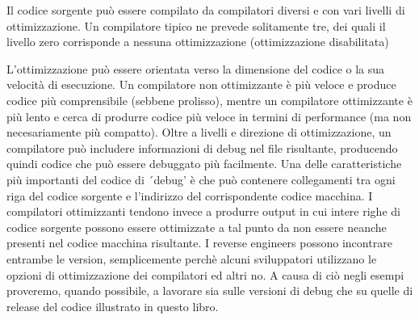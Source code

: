 Il codice sorgente può essere compilato da compilatori diversi e con vari livelli di ottimizzazione.
Un compilatore tipico ne prevede solitamente tre, dei quali il livello zero corrisponde a nessuna ottimizzazione (ottimizzazione disabilitata) 

L'ottimizzazione può essere orientata verso la dimensione del codice o la sua velocità di esecuzione.
Un compilatore non ottimizzante è più veloce e produce codice più comprensibile (sebbene prolisso), mentre un compilatore ottimizzante è più lento e cerca di produrre codice più veloce in termini di performance (ma non necesariamente più compatto).
Oltre a livelli e direzione di ottimizzazione, un compilatore può includere informazioni di debug nel file risultante, producendo quindi codice che può essere debuggato più facilmente.
Una delle caratteristiche più importanti del codice di ´debug' è che può contenere collegamenti tra ogni riga del codice sorgente e l'indirizzo del corrispondente codice macchina.
I compilatori ottimizzanti tendono invece a produrre output in cui intere righe di codice sorgente possono essere ottimizzate a tal punto da non essere neanche presenti nel codice macchina risultante.
I reverse engineers possono incontrare entrambe le version, semplicemente perchè alcuni sviluppatori utilizzano le opzioni di ottimizzazione dei compilatori ed altri no. A causa di ciò negli esempi proveremo, quando possibile, a lavorare sia sulle versioni di debug che su quelle di release del codice illustrato in questo libro.
